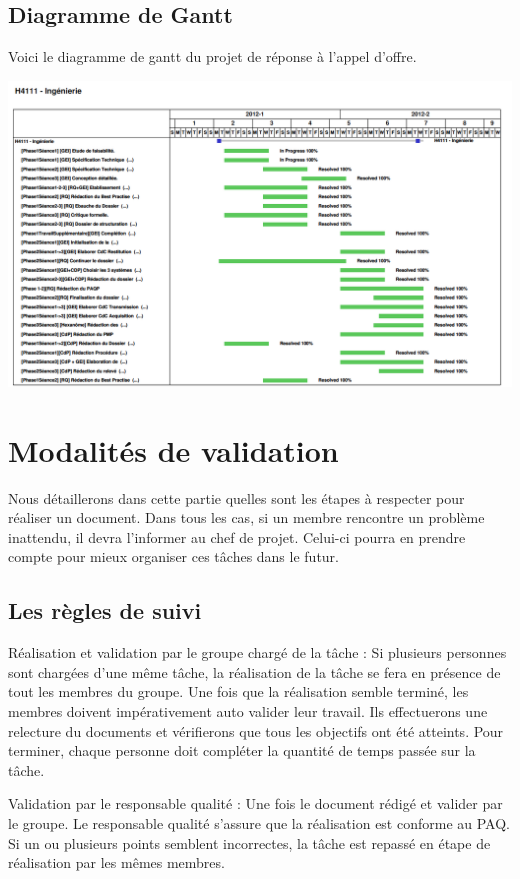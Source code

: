 \subsection{Diagramme de Gantt}
Voici le diagramme de gantt du projet de réponse à l'appel d'offre. 
\begin {center}
\includegraphics[width=\textwidth]{png/Gantt.png}
\end {center}

    
    \section{Modalités de validation}
Nous détaillerons dans cette partie quelles sont les étapes à respecter pour réaliser un document. Dans tous les cas, si un membre rencontre un problème inattendu, il devra l’informer au chef de projet. Celui-ci pourra en prendre compte pour mieux organiser ces tâches dans le futur.
     \subsection{Les règles de suivi}
Réalisation et validation par le groupe chargé de la tâche :
Si plusieurs personnes sont chargées d’une même tâche, la réalisation de la tâche se fera en présence de tout les membres du groupe. Une fois que la réalisation semble terminé, les membres doivent impérativement auto valider leur travail. Ils effectuerons une relecture du documents et vérifierons que tous les objectifs ont été atteints. Pour terminer, chaque personne doit compléter la quantité de temps passée sur la tâche.

Validation par le responsable qualité :
Une fois le document rédigé et valider par le groupe. Le responsable qualité s’assure que la réalisation est conforme au PAQ. Si un ou plusieurs points semblent incorrectes, la tâche est repassé en étape de réalisation par les mêmes membres.

